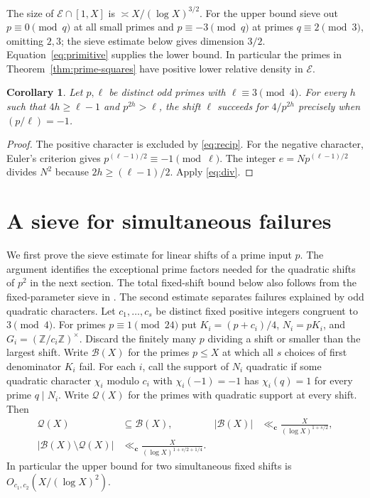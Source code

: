 \documentclass[a4paper,11pt]{article}
\newtheorem{corollary}[theorem]{Corollary}
\theoremstyle{definition}\newtheorem{question}[theorem]{Question}
\newcommand{\E}{\mathcal E}
\begin{document}
The size of $\E\cap[1,X]$ is $\asymp X/(\log X)^{3/2}$. For the upper bound sieve out $p\equiv0\pmod q$ at all small primes and $p\equiv-3\pmod q$ at primes $q\equiv2\pmod3$, omitting $2,3$; the sieve estimate below gives dimension $3/2$. Equation~\eqref{eq:primitive} supplies the lower bound. In particular the primes in Theorem~\ref{thm:prime-squares} have positive lower relative density in $\E$.

\begin{corollary}\label{cor:eventual}
Let $p,\ell$ be distinct odd primes with $\ell\equiv3\pmod4$. For every $h$ such that $4h\ge\ell-1$ and $p^{2h}>\ell$, the shift $\ell$ succeeds for $4/p^{2h}$ precisely when $(p/\ell)=-1$.
\end{corollary}
\begin{proof}
The positive character is excluded by \eqref{eq:recip}. For the negative character, Euler's criterion gives $p^{(\ell-1)/2}\equiv-1\pmod\ell$. The integer $e=Np^{(\ell-1)/2}$ divides $N^2$ because $2h\ge(\ell-1)/2$. Apply \eqref{eq:div}.
\end{proof}


\section{A sieve for simultaneous failures}\label{sec:sieve}
We first prove the sieve estimate for linear shifts of a prime input $p$. The argument identifies the exceptional prime factors needed for the quadratic shifts of $p^2$ in the next section. The total fixed-shift bound below also follows from the fixed-parameter sieve in \cite{dahan}. The second estimate separates failures explained by odd quadratic characters.
Let $c_1,\ldots,c_s$ be distinct fixed positive integers congruent to
$3\pmod4$. For primes $p\equiv1\pmod{24}$ put
$K_i=(p+c_i)/4$, $N_i=pK_i$, and $G_i=(\mathbb Z/c_i\mathbb Z)^\times$.
Discard the finitely many $p$ dividing a shift or smaller than the largest shift. Write $\mathcal B(X)$
for the primes $p\le X$ at which all $s$ choices of first denominator
$K_i$ fail. For each $i$, call the support of $N_i$ quadratic if
some quadratic character $\chi_i$ modulo $c_i$ with $\chi_i(-1)=-1$
has $\chi_i(q)=1$ for every prime $q\mid N_i$. Write
$\mathcal Q(X)$ for the primes with quadratic support at every shift.
Then
\begin{align}
 \mathcal Q(X)&\subseteq\mathcal B(X),&
 |\mathcal B(X)|&\ll_{\mathbf c}\frac{X}{(\log X)^{1+s/2}},\label{eq:esjoint}\\
 |\mathcal B(X)\setminus\mathcal Q(X)|
    &\ll_{\mathbf c}\frac{X}{(\log X)^{1+s/2+1/4}}.\label{eq:esremainder}
\end{align}
In particular the upper bound for two simultaneous fixed shifts is
$O_{c_1,c_2}(X/(\log X)^2)$.
\end{document}
